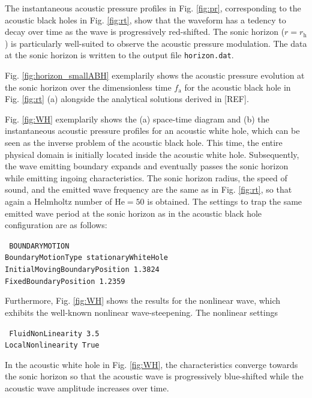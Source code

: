The instantaneous acoustic pressure profiles in Fig. \ref{fig:pr}, corresponding to the acoustic black holes in Fig. \ref{fig:rt}, show that the waveform has a tedency to decay over time as the wave is progressively red-shifted. The sonic horizon ($r=r_{\mathrm{h}}$) is particularly well-suited to observe the acoustic pressure modulation. The data at the sonic horizon is written to the output file {\tt horizon.dat}.

Fig. \ref{fig:horizon_smallABH} exemplarily shows the acoustic pressure evolution at the sonic horizon over the dimensionless time $f_{\mathrm{a}}$ for the acoustic black hole in Fig. \ref{fig:rt} (a) alongside the analytical solutions derived in [REF].

Fig. \ref{fig:WH} exemplarily shows the (a) space-time diagram and (b) the instantaneous acoustic pressure profiles for an acoustic white hole, which can be seen as the inverse problem of the acoustic black hole. This time, the entire physical domain is initially located inside the acoustic white hole. Subsequently, the wave emitting boundary expands and eventually passes the sonic horizon while emitting ingoing characteristics. The sonic horizon radius, the speed of sound, and the emitted wave frequency are the same as in Fig. \ref{fig:rt}, so that again a Helmholtz number of $\mathrm{He}=50$ is obtained. The settings to trap the same emitted wave period at the sonic horizon as in the acoustic black hole configuration are as follows:

{\tt
BOUNDARYMOTION \\
BoundaryMotionType stationaryWhiteHole \\
InitialMovingBoundaryPosition 1.3824 \\
FixedBoundaryPosition 1.2359
}

Furthermore, Fig. \ref{fig:WH} shows the results for the nonlinear wave, which exhibits the well-known nonlinear wave-steepening. The nonlinear settings

{\tt
FluidNonLinearity 3.5 \\
LocalNonlinearity True
}

In the acoustic white hole in Fig. \ref{fig:WH}, the characteristics converge towards the sonic horizon so that the acoustic wave is progressively blue-shifted while the acoustic wave amplitude increases over time.

